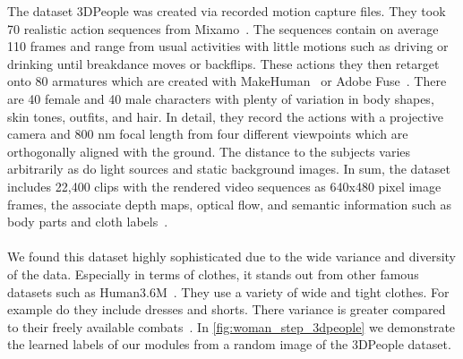 The dataset 3DPeople was created via recorded motion capture files.
They took 70 realistic action sequences from Mixamo~\cite{mixamomotionpac}.
The sequences contain on average 110 frames and range from usual activities with little motions such as driving
or drinking until breakdance moves or backflips.
These actions they then retarget onto 80 armatures which are created with MakeHuman~\cite{makehuman} or Adobe
Fuse~\cite{adobefuse}.
There are 40 female and 40 male characters with plenty of variation in body shapes, skin tones, outfits, and hair.
In detail, they record the actions with a projective camera and 800 nm focal length from four different viewpoints
which are orthogonally aligned with the ground.
The distance to the subjects varies arbitrarily as do light sources and static background images.
In sum, the dataset includes 22,400 clips with the rendered video sequences as 640x480 pixel image frames, the associate
depth maps, optical flow, and semantic information such as body parts and cloth labels~\cite{3dpeople}.
\\\mbox{}\\
We found this dataset highly sophisticated due to the wide variance and diversity of the data.
Especially in terms of clothes, it stands out from other famous datasets such as Human3.6M~\cite{humaneva}.
They use a variety of wide and tight clothes. For example do they include dresses and shorts.
There variance is greater compared to their freely available combats~\cite{human36m, humaneva}.
In \autoref{fig:woman_step_3dpeople} we demonstrate the learned labels of our modules from a random image of the
3DPeople dataset.





